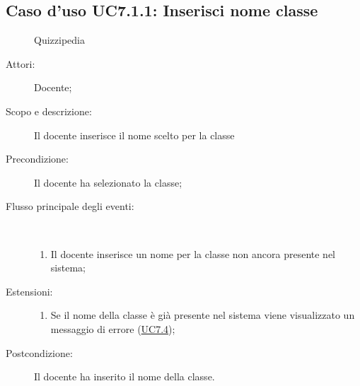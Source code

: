 \subsection{Caso d'uso UC7.1.1: Inserisci nome classe}
	\begin{figure}[H]
		\centering
		\begin{resizedtikzpicture}{\textwidth}
		\begin{umlsystem}[x=0, fill=lightgray!20]{Quizzipedia}
		\end{umlsystem}
		\end{resizedtikzpicture}
		\caption{}
	\end{figure}
\begin{description}
\item[Attori:] Docente;
\item[Scopo e descrizione:] Il docente inserisce il nome scelto per la classe
      \item[Precondizione:] Il docente ha selezionato la classe;

        \item[Flusso principale degli eventi:] \ 
 \begin{enumerate}
          \item Il docente inserisce un nome per la classe non ancora presente nel sistema;

      \end{enumerate}
    \item[Estensioni:]
      \begin{enumerate}
          \item Se il nome della classe è già presente nel sistema viene visualizzato un messaggio di errore (\hyperlink{UC7.4}{UC7.4});

      \end{enumerate}
    \item[Postcondizione:] Il docente ha inserito il nome della classe.
  \end{description}
\hypertarget{UC7.1.2}{}
